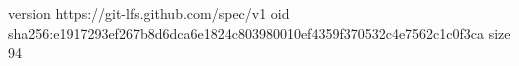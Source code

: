 version https://git-lfs.github.com/spec/v1
oid sha256:e1917293ef267b8d6dca6e1824c803980010ef4359f370532c4e7562c1c0f3ca
size 94

